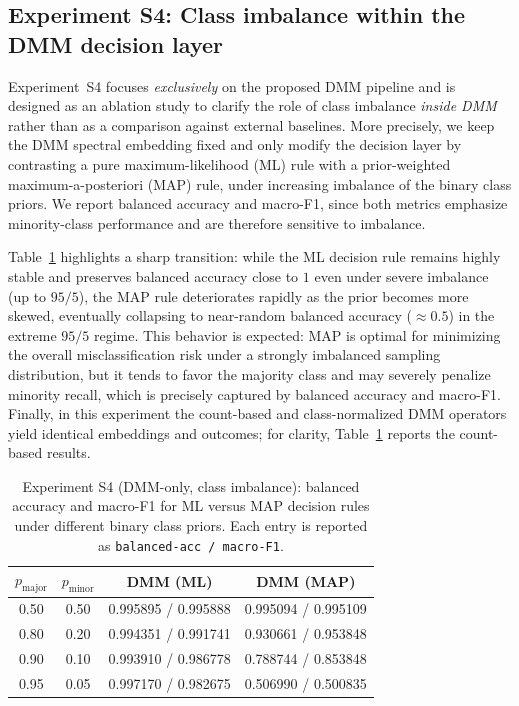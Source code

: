 \documentclass[preprint,11pt]{elsarticle}
\begin{document}
\subsection{Experiment S4: Class imbalance within the DMM decision layer}
\label{subsec:exp_s4}

Experiment~S4 focuses \emph{exclusively} on the proposed DMM pipeline and is designed as an ablation study to clarify the role of
class imbalance \emph{inside DMM} rather than as a comparison against external baselines.
More precisely, we keep the DMM spectral embedding fixed and only modify the decision layer by contrasting a pure
maximum-likelihood (ML) rule with a prior-weighted maximum-a-posteriori (MAP) rule, under increasing imbalance of the binary class priors.
We report balanced accuracy and macro-F1, since both metrics emphasize minority-class performance and are therefore sensitive to imbalance.

Table~\ref{tab:s4_results_compact} highlights a sharp transition: while the ML decision rule remains highly stable and preserves
balanced accuracy close to $1$ even under severe imbalance (up to $95/5$), the MAP rule deteriorates rapidly as the prior becomes
more skewed, eventually collapsing to near-random balanced accuracy ($\approx 0.5$) in the extreme $95/5$ regime.
This behavior is expected: MAP is optimal for minimizing the overall misclassification risk under a strongly imbalanced sampling distribution,
but it tends to favor the majority class and may severely penalize minority recall, which is precisely captured by balanced accuracy and macro-F1.
Finally, in this experiment the count-based and class-normalized DMM operators yield identical embeddings and outcomes; for clarity,
Table~\ref{tab:s4_results_compact} reports the count-based results.

\begin{table}[H]
\centering
\caption{Experiment S4 (DMM-only, class imbalance): balanced accuracy and macro-F1 for ML versus MAP decision rules under different binary class priors.
Each entry is reported as \texttt{balanced-acc / macro-F1}.}
\label{tab:s4_results_compact}
\setlength{\tabcolsep}{6pt}
\renewcommand{\arraystretch}{1.12}
\begin{tabular}{c c c c}
\toprule
$p_{\mathrm{major}}$ & $p_{\mathrm{minor}}$ & DMM (ML) & DMM (MAP) \\
\midrule
0.50 & 0.50 & 0.995895 / 0.995888 & 0.995094 / 0.995109 \\
0.80 & 0.20 & 0.994351 / 0.991741 & 0.930661 / 0.953848 \\
0.90 & 0.10 & 0.993910 / 0.986778 & 0.788744 / 0.853848 \\
0.95 & 0.05 & 0.997170 / 0.982675 & 0.506990 / 0.500835 \\
\bottomrule
\end{tabular}
\end{table}
\end{document}
